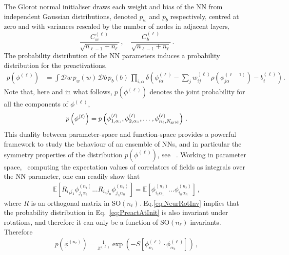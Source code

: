\documentclass[11pt]{article}
\begin{document}
The Glorot normal initialiser draws each weight and bias of the NN from independent Gaussian
distributions, denoted $p_w$ and $p_b$ respectively, centred at zero and with variances 
rescaled by the number of nodes in adjacent layers, 
\begin{equation}
    \label{eq:RescaledGlorotVariances}
    \frac{C^{(\ell)}_{w}}{\sqrt{n_{\ell-1} + n_{\ell}}}\, , 
    \quad \frac{C^{(\ell)}_{b}}{\sqrt{n_{\ell-1} + n_{\ell}}}\, .
\end{equation}
The probability distribution of the NN parameters induces a probability distribution for the 
preactivations, 
\begin{align}
    \label{eq:PreactAtInit}
    p\left(\phi^{(\ell)}\right) 
      &= \int \mathcal{D}w\, p_w(w)\,
        \mathcal{D}b\, p_b(b)\, \prod_{i,\alpha} 
        \delta\left(
          \phi^{(\ell)}_{i\alpha} - \sum_{j} w^{(\ell)}_{ij} 
          \rho\left(\phi^{(\ell-1)}_{j\alpha}\right) 
          - b^{(\ell)}_i 
          \right)\, .
\end{align}
Note that, here and in what follows, $p(\phi^{(\ell)})$ denotes the joint probability for all the components 
of $\phi^{(\ell)}$, 
\begin{align}
    \label{eq:ExplIndices}
    p\left(\phi^{(\ell)}\right) = p\left(\phi^{(\ell)}_{1,\alpha_1}, \phi^{(\ell)}_{2,\alpha_1}, \ldots, 
        \phi^{(\ell)}_{n_\ell,N_{\mathrm{grid}}}\right)\, .
\end{align}
This duality between parameter-space and function-space provides a powerful framework to study 
the behaviour of an ensemble of NNs, and in particular the symmetry properties of the distribution
$p(\phi^{(\ell)})$, see \eg~\cite{Maiti:2021fpy}. Working in parameter space, \ie\ computing the 
expectation values of correlators of fields as integrals over the NN parameter, one can readily 
show that 
\begin{align}
    \label{eq:NeurRotInv}
    \mathbb{E}\left[
        R_{i_1j_1} \phi^{(n_\ell)}_{j_1 \alpha_1} \ldots
        R_{i_nj_n} \phi^{(n_\ell)}_{j_n \alpha_n}
    \right] = 
    \mathbb{E}\left[
        \phi^{(n_\ell)}_{i_1 \alpha_1} \ldots
        \phi^{(n_\ell)}_{i_n \alpha_n}
    \right]\, ,
\end{align}
where $R$ is an orthogonal matrix in $\text{SO}(n_{\ell})$. Eq.\eqref{eq:NeurRotInv} implies 
that the probability distribution in Eq.~\eqref{eq:PreactAtInit} is also invariant under rotations, 
and therefore it can only be a function of $\text{SO}(n_{\ell})$ invariants. Therefore 
\begin{align}
    \label{eq:PriorAction}
    p\left(\phi^{(n_\ell)}\right) = 
        \frac{1}{Z^{(\ell)}} \exp\left(-S\left[\phi^{(\ell)}_{\alpha_1} 
            \cdot \phi^{(\ell)}_{\alpha_2}\right]\right)\, , 
\end{align}
\end{document}

